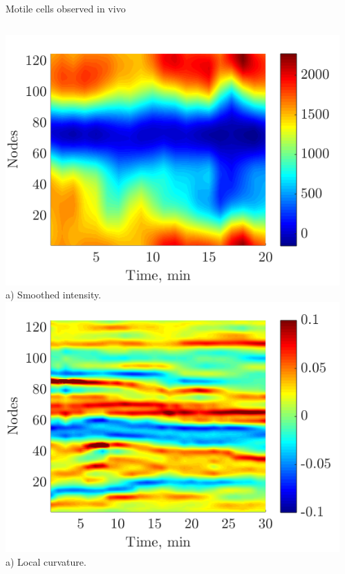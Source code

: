 \documentclass[mathserif,11pt]{beamer}
\begin{document}
\begin{frame}{Motile cells observed in vivo}
\begin{columns}
	\begin{column}{0.5\textwidth}
		\centering
		\includegraphics[scale=0.3]{Figures/m4_akt.png}\vfil
		\footnotesize{a) Smoothed intensity.}
		\vfil
		\includegraphics[scale=0.3]{Figures/m4_curvature.png}\vfil	
		\footnotesize{a) Local curvature.}
	\end{column}
	\begin{column}{0.5\textwidth}
		\centering

\end{column}
\end{columns}
\end{frame}
\end{document}
